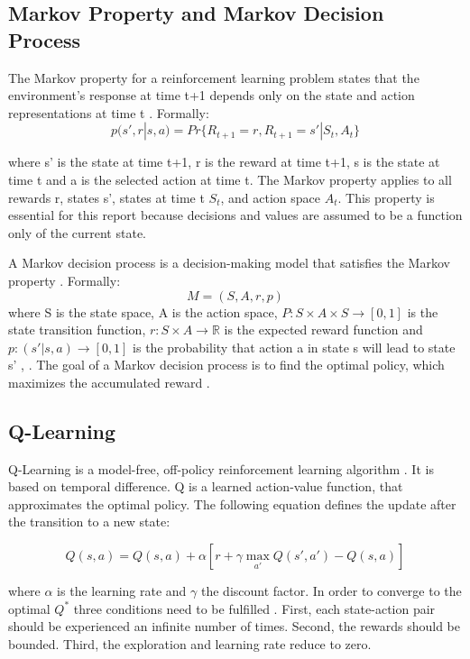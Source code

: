 \documentclass[
	letterpaper, %
	12pt, %
]{CSUniSchoolLabReport}
\begin{document}
\subsection{Markov Property and Markov Decision Process \AB}
The Markov property for a reinforcement learning problem states
that the environment's response at time t+1 depends only on the state and action representations
at time t \cite{BookRL}. Formally:
\[p(s',r|s,a) = Pr\{R_{t+1}=r , R_{t+1} =s' | S_t, A_t\}\]

where s' is the state at time t+1, r is the reward at time t+1, s is the state
at time t and a is the selected action at time t. The Markov property applies
to all rewards r, states s', states at time t $S_t$, and action space $A_t$.
This property is essential for this report because decisions and values
are assumed to be a function only of the current state.

A Markov decision process is a decision-making model \cite{MDP} that satisfies the
Markov property \cite{BookRL}.
Formally:
\[M = ( S, A, r, p)\]
where S is the state space, A is the action space, $P: S \times A \times S \longrightarrow [0,1]$
is the state transition function, $r: S \times A \longrightarrow \mathbb{R}$ is the
expected reward function and $p: (s'|s,a) \longrightarrow [0,1]$ is the probability that action a
in state s will lead to state s' \cite{BookRL}, \cite{MDP}. The goal of a Markov decision
process is to find the optimal policy, which maximizes the accumulated reward \cite{BookRL}.

\subsection{Q-Learning \AB}

Q-Learning is a model-free, off-policy reinforcement learning algorithm \cite{BookRL}.
It is based on temporal difference.
Q is a learned action-value function, that approximates the
optimal policy. The following equation
defines the update after the transition to a new state:

\[Q(s,a) = Q(s,a) + \alpha[r + \gamma \max_{a'} Q(s', a') - Q(s,a)] \]

where $\alpha$ is the learning rate and $\gamma$ the discount
factor. In order to converge to the optimal $Q^*$ three conditions need to be fulfilled \cite{qlearning}.
First, each state-action pair should be experienced an infinite number of times. Second, the
rewards should be bounded. Third, the exploration and learning rate reduce to zero.
\end{document}
